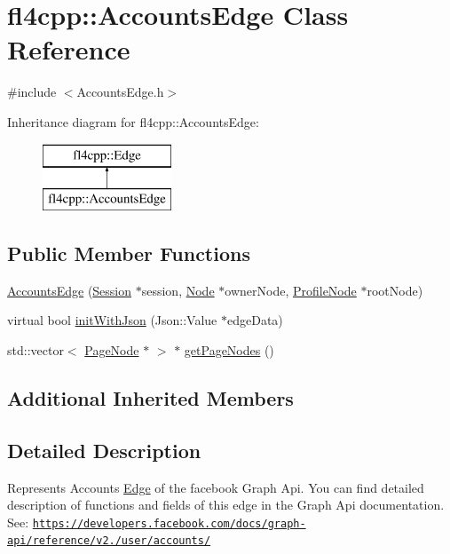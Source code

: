 \hypertarget{classfl4cpp_1_1_accounts_edge}{}\section{fl4cpp\+:\+:Accounts\+Edge Class Reference}
\label{classfl4cpp_1_1_accounts_edge}


{\ttfamily \#include $<$Accounts\+Edge.\+h$>$}

Inheritance diagram for fl4cpp\+:\+:Accounts\+Edge\+:\begin{figure}[H]
\begin{center}
\leavevmode
\includegraphics[height=2.000000cm]{classfl4cpp_1_1_accounts_edge}
\end{center}
\end{figure}
\subsection*{Public Member Functions}
\begin{DoxyCompactItemize}
\item 
\hyperlink{classfl4cpp_1_1_accounts_edge_afea96e7a199151fd308c550e91900043}{Accounts\+Edge} (\hyperlink{classfl4cpp_1_1_session}{Session} $\ast$session, \hyperlink{classfl4cpp_1_1_node}{Node} $\ast$owner\+Node, \hyperlink{classfl4cpp_1_1_profile_node}{Profile\+Node} $\ast$root\+Node)
\item 
virtual bool \hyperlink{classfl4cpp_1_1_accounts_edge_aa7efb829333e417c3fb5c93b4c1cb9b5}{init\+With\+Json} (Json\+::\+Value $\ast$edge\+Data)
\item 
std\+::vector$<$ \hyperlink{classfl4cpp_1_1_page_node}{Page\+Node} $\ast$ $>$ $\ast$ \hyperlink{classfl4cpp_1_1_accounts_edge_a7c386e9d480d1438d699903dc0a56e90}{get\+Page\+Nodes} ()
\end{DoxyCompactItemize}
\subsection*{Additional Inherited Members}


\subsection{Detailed Description}
Represents Accounts \hyperlink{classfl4cpp_1_1_edge}{Edge} of the facebook Graph Api. You can find detailed description of functions and fields of this edge in the Graph Api documentation. See\+: \href{https://developers.facebook.com/docs/graph-api/reference/v2.0/user/accounts/}{\tt https\+://developers.\+facebook.\+com/docs/graph-\/api/reference/v2./user/accounts/} 


